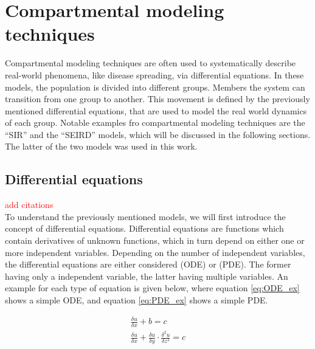 \section{Compartmental modeling techniques}
Compartmental modeling techniques are often used to systematically describe real-world phenomena,
like disease spreading, via differential equations\cite{kermack1991contributions,kendall1956deterministic}. In these models, the population is divided into different groups. 
Members the system can transition from one group to another. This movement is defined by the previously mentioned differential equations, that are used to model the real
world dynamics of each group. Notable examples fro compartmental modeling techniques are the ``SIR'' and the ``SEIRD'' models, which will be discussed in
the following sections. The latter of the two models was used in this work.


\subsection{Differential equations}
\textcolor{red}{add citations}\\ %
To understand the previously mentioned models, we will first introduce the concept of differential equations.
Differential equations are functions which contain derivatives of unknown functions, which in turn depend
on either one or more independent variables. Depending on the number of independent variables, the differential
equations are either considered  (ODE) or
 (PDE). The former having only a independent variable, the latter having multiple variables.
An example for each type of equation is given below, where equation \ref*{eq:ODE_ex} shows a simple ODE, and equation \ref*{eq:PDE_ex} shows a
simple PDE.\newline

\begin{align}
	\frac{\delta u}{\delta x} + b = c \label{eq:ODE_ex}\\
	\frac{\delta u}{\delta x} + \frac{\delta u}{\delta y} \cdot \frac{\delta^2 u}{\delta z^2} = c \label{eq:PDE_ex}
\end{align}

